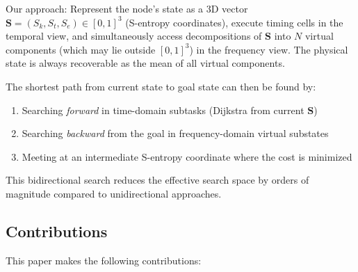 \documentclass[twocolumn,11pt,a4paper]{article}
\newcommand{\Sk}{S_{k}}
\newcommand{\St}{S_{t}}
\newcommand{\Se}{S_{e}}
\newcommand{\Stuple}{\mathbf{S}}
\begin{document}
Our approach: Represent the node's state as a 3D vector $\Stuple = (\Sk, \St, \Se) \in [0,1]^3$ (S-entropy coordinates), execute timing cells in the temporal view, and simultaneously access decompositions of $\Stuple$ into $N$ virtual components (which may lie outside $[0,1]^3$) in the frequency view. The physical state is always recoverable as the mean of all virtual components.

The shortest path from current state to goal state can then be found by:
\begin{enumerate}[nosep]
  \item Searching \emph{forward} in time-domain subtasks (Dijkstra from current $\Stuple$)
  \item Searching \emph{backward} from the goal in frequency-domain virtual substates
  \item Meeting at an intermediate S-entropy coordinate where the cost is minimized
\end{enumerate}

This bidirectional search reduces the effective search space by orders of magnitude compared to unidirectional approaches.

\subsection{Contributions}

This paper makes the following contributions:
\end{document}
